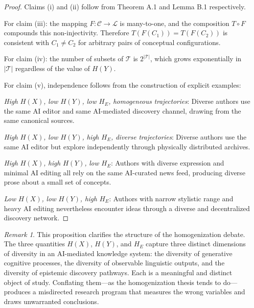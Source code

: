 \documentclass[12pt,a4paper]{article}
\theoremstyle{definition}
\theoremstyle{plain}
\theoremstyle{remark}
\newtheorem{remark}[definition]{Remark}
\newcommand{\HE}{H_{E}}
\newcommand{\calL}{\mathcal{L}}
\newcommand{\calC}{\mathcal{C}}
\newcommand{\calT}{\mathcal{T}}
\begin{document}
\begin{proof}
Claims (i) and (ii) follow from Theorem A.1 and Lemma B.1 respectively.

For claim (iii): the mapping $F : \calC \to \calL$ is many-to-one, and the composition
$T \circ F$ compounds this non-injectivity. Therefore $T(F(C_1)) = T(F(C_2))$ is consistent
with $C_1 \neq C_2$ for arbitrary pairs of conceptual configurations.

For claim (iv): the number of subsets of $\calT$ is $2^{|\calT|}$, which grows exponentially
in $|\calT|$ regardless of the value of $H(Y)$.

For claim (v), independence follows from the construction of explicit examples:

\emph{High $H(X)$, low $H(Y)$, low $\HE$, homogeneous trajectories}: Diverse authors use
the same AI editor and same AI-mediated discovery channel, drawing from the same canonical
sources.

\emph{High $H(X)$, low $H(Y)$, high $\HE$, diverse trajectories}: Diverse authors use the
same AI editor but explore independently through physically distributed archives.

\emph{High $H(X)$, high $H(Y)$, low $\HE$}: Authors with diverse expression and minimal AI
editing all rely on the same AI-curated news feed, producing diverse prose about a small set
of concepts.

\emph{Low $H(X)$, low $H(Y)$, high $\HE$}: Authors with narrow stylistic range and heavy
AI editing nevertheless encounter ideas through a diverse and decentralized discovery network.
\end{proof}

\begin{remark}
This proposition clarifies the structure of the homogenization debate. The three quantities
$H(X)$, $H(Y)$, and $\HE$ capture three distinct dimensions of diversity in an AI-mediated
knowledge system: the diversity of generative cognitive processes, the diversity of observable
linguistic outputs, and the diversity of epistemic discovery pathways. Each is a meaningful
and distinct object of study. Conflating them---as the homogenization thesis tends to
do---produces a misdirected research program that measures the wrong variables and draws
unwarranted conclusions.
\end{remark}

\newpage

\end{document}
